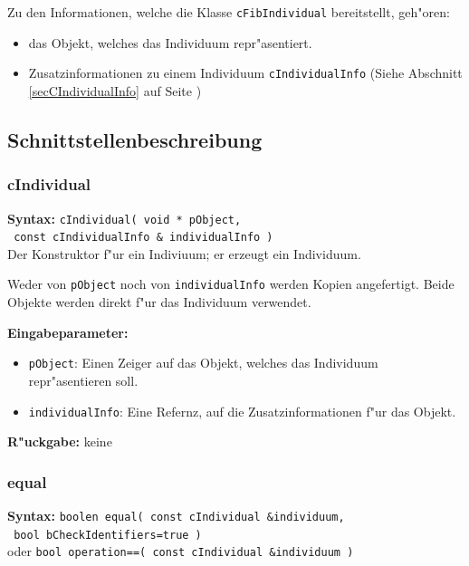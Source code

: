 \bigskip\noindent
Zu den Informationen, welche die Klasse \verb|cFibIndividual| bereitstellt, geh"oren:
\begin{itemize}
 \item das Objekt, welches das Individuum repr"asentiert.
 \item Zusatzinformationen zu einem Individuum \verb|cIndividualInfo| (Siehe Abschnitt \ref{secCIndividualInfo} auf Seite \pageref{secCIndividualInfo})
\end{itemize}


\subsection{Schnittstellenbeschreibung}

\subsubsection{cIndividual}

\textbf{Syntax:} \verb|cIndividual( void * pObject,| \\\verb| const cIndividualInfo & individualInfo )| \\

Der Konstruktor f"ur ein Indiviuum; er erzeugt ein Individuum.

Weder von \verb|pObject| noch von \verb|individualInfo| werden Kopien angefertigt. Beide Objekte werden direkt f"ur das Individuum verwendet.

\bigskip\noindent
\textbf{Eingabeparameter:}
\begin{itemize}
 \item \verb|pObject|: Einen Zeiger auf das Objekt, welches das Individuum repr"asentieren soll.
 \item \verb|individualInfo|: Eine Refernz, auf die Zusatzinformationen f"ur das Objekt.
\end{itemize}

\bigskip\noindent
\textbf{R"uckgabe:} keine


\subsubsection{equal}

\textbf{Syntax:} \verb|boolen equal( const cIndividual &individuum,| \\\verb| bool bCheckIdentifiers=true )| \\
oder \verb|bool operation==( const cIndividual &individuum )|

